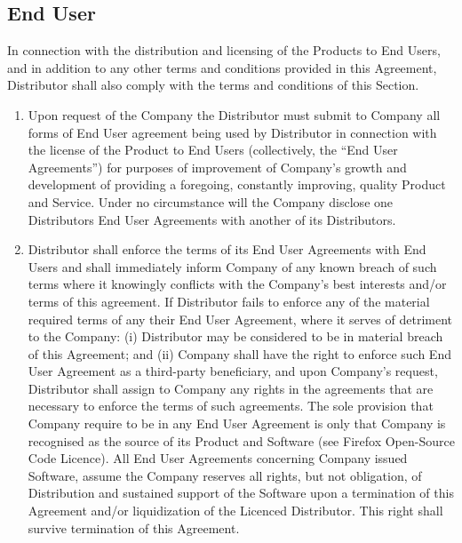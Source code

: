\documentclass[letterpaper,10pt,openany,oneside,english]{sphinxmanual}
\begin{document}
\subsection{End User}
\label{\detokenize{distributionandpackaging:end-user}}
In connection with the distribution and licensing of the Products to End Users, and in addition to any other terms and conditions provided in this Agreement, Distributor shall also comply with the terms and conditions of this Section.
\begin{enumerate}
\item {} 
Upon request of the Company the Distributor must submit to Company all forms of End User agreement being used by Distributor in connection with the license of the Product to End Users (collectively, the “End User Agreements”) for purposes of improvement of Company’s growth and development of providing a foregoing, constantly improving, quality Product and Service. Under no circumstance will the Company  disclose one Distributors End User Agreements with another of its Distributors.

\item {} 
Distributor shall enforce the terms of its End User Agreements with End Users and shall immediately inform Company of any known breach of such terms where it knowingly conflicts with the Company’s best interests and/or terms of this agreement. If Distributor fails to enforce any of the material required terms of any their End User Agreement, where it serves of detriment to the Company: (i) Distributor may be considered to be in material breach of this Agreement; and (ii) Company shall have the right to enforce such End User Agreement as a third-party beneficiary, and upon Company’s request, Distributor shall assign to Company any rights in the agreements that are necessary to enforce the terms of such agreements. The sole provision that Company require to be in any End User Agreement is only that Company is recognised as the source of its Product and Software (see Firefox Open-Source Code Licence). All End User Agreements concerning Company issued Software, assume the Company reserves all rights, but not obligation, of Distribution and sustained support of the Software upon a termination of this Agreement and/or liquidization of the Licenced Distributor. This right shall survive termination of this Agreement.

\end{enumerate}
\end{document}
